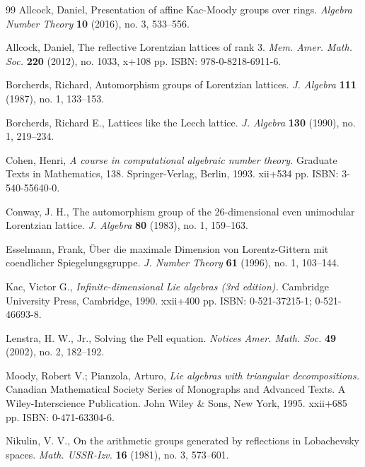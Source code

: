 \documentclass[12pt]{amsart}
\numberwithin{theorem}{section}
\numberwithin{equation}{section}
\numberwithin{figure}{section}
\theoremstyle{remark}
\begin{document}
\begin{thebibliography}{99}
Allcock, Daniel, Presentation of affine Kac-Moody groups over rings. 
        {\it Algebra Number Theory} {\bf10} (2016), no. 3, 533--556.

        Allcock, Daniel, The reflective Lorentzian lattices of rank 3. {\it
        Mem. Amer. Math. Soc.} {\bf 220} (2012), no. 1033, x+108 pp. 
        ISBN: 978-0-8218-6911-6.

        Borcherds, Richard, Automorphism groups of Lorentzian lattices. {\it
        J. Algebra} {\bf111} (1987), no. 1, 133--153. 

Borcherds, Richard E., Lattices like the Leech lattice. 
        {\it J. Algebra} {\bf130} (1990), no. 1, 219--234.

        Cohen, Henri, {\it 
        A course in computational algebraic number theory.} 
        Graduate Texts in Mathematics, 138. 
        Springer-Verlag, Berlin, 1993. xii+534 pp. ISBN: 3-540-55640-0.

Conway, J. H., 
        The automorphism group of the 26-dimensional 
        even unimodular Lorentzian lattice. 
        {\it J. Algebra} {\bf80} (1983), no. 1, 159--163.

    Esselmann, Frank, 
        \"Uber die maximale Dimension von Lorentz-Gittern mit coendlicher Spiegelungsgruppe. {\it J. Number Theory} {\bf61} (1996), no. 1, 103--144.

        Kac, Victor G., {\it Infinite-dimensional Lie algebras (3rd edition).}
        Cambridge University Press, Cambridge, 1990. xxii+400 pp. 
        ISBN: 0-521-37215-1; 0-521-46693-8.        

 Lenstra, H. W., Jr.,
        Solving the Pell equation. 
        {\it Notices Amer. Math. Soc.} {\bf49} (2002), no. 2, 182--192. 

Moody, Robert V.; Pianzola, Arturo,
        {\it Lie algebras with triangular decompositions.}
        Canadian Mathematical Society Series of Monographs and Advanced Texts. 
        A Wiley-Interscience Publication. John Wiley \& Sons, New York, 1995. xxii+685 pp. ISBN: 0-471-63304-6.

Nikulin, V. V.,
        On the arithmetic groups generated by reflections in Lo\-ba\-chev\-sky spaces.
        {\it Math. USSR-Izv.} {\bf16} (1981), no. 3, 573--601.


\end{thebibliography}
\end{document}

